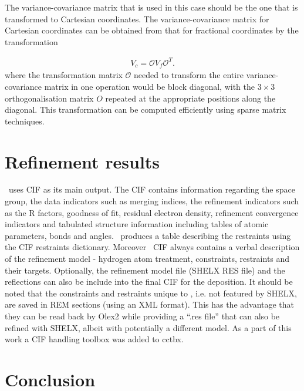 \documentclass[pdf]{iucr}
\newcommand{\mat}[1]{#1}
\begin{document}
The variance-covariance matrix that is used in this case should be the one that is transformed to Cartesian coordinates. The variance-covariance matrix for Cartesian coordinates can be obtained from that for fractional coordinates by the transformation

\begin{align}
\mat{V}_{c} = \mat{\mathcal{O}} \mat{V}_{f} \mat{\mathcal{O}}^{T}.
\label{eqn:vcv_cart}
\end{align}
where the transformation matrix $\mathcal{O}$ needed to transform the entire variance-covariance matrix in one operation would be block diagonal, with the $3 \times 3$ orthogonalisation matrix $O$ repeated at the appropriate positions along the diagonal. This transformation can be computed efficiently using sparse matrix techniques.

\section{Refinement results}

\olexrefine\ uses CIF  as its main output. The CIF contains information regarding the space group, the data indicators such as merging indices, the refinement indicators such as the R factors, goodness of fit, residual electron density, refinement convergence indicators and tabulated structure information including tables of atomic parameters, bonds and angles. \olexrefine\ produces a table describing the restraints using the CIF restraints dictionary. Moreover \olexrefine\ CIF always contains a verbal description of the refinement model - hydrogen atom treatment, constraints, restraints and their targets. Optionally, the refinement model file (SHELX RES file) and the reflections can also be include into the final CIF for the deposition. It should be noted that the constraints and restraints unique to \olexrefine, i.e. not featured by SHELX, are saved in REM sections (using an XML format). This has the advantage that they can be read back by Olex2 while providing a ``.res file'' that can also be refined with SHELX, albeit with potentially a different model. As a part of this work a CIF handling toolbox  was added to cctbx.

\section{Conclusion}
\end{document}

